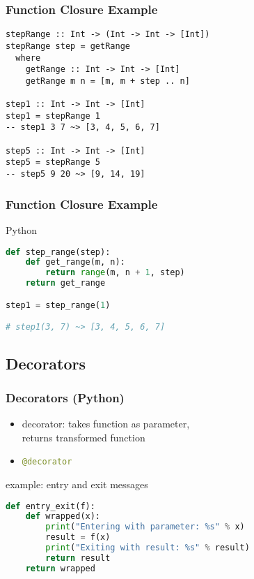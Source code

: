 \documentclass[dvipsnames]{beamer}
\theoremstyle{plain}
\begin{document}
\begin{frame}[fragile]
  \frametitle{Function Closure Example}

  \begin{lstlisting}
stepRange :: Int -> (Int -> Int -> [Int])
stepRange step = getRange
  where
    getRange :: Int -> Int -> [Int]
    getRange m n = [m, m + step .. n]

step1 :: Int -> Int -> [Int]
step1 = stepRange 1
-- step1 3 7 ~> [3, 4, 5, 6, 7]

step5 :: Int -> Int -> [Int]
step5 = stepRange 5
-- step5 9 20 ~> [9, 14, 19]
  \end{lstlisting}
\end{frame}

\begin{frame}[fragile]
  \frametitle{Function Closure Example}

  \begin{exampleblock}{Python}
    \begin{lstlisting}[language=Python]
def step_range(step):
    def get_range(m, n):
        return range(m, n + 1, step)
    return get_range

step1 = step_range(1)

# step1(3, 7) ~> [3, 4, 5, 6, 7]
    \end{lstlisting}
  \end{exampleblock}
\end{frame}

\subsection{Decorators}

\begin{frame}[fragile]
  \frametitle{Decorators (Python)}

  \begin{itemize}
    \item decorator: takes function as parameter,\\
      returns transformed function
    \item \lstinline[language=Python]|@decorator|
  \end{itemize}

  \begin{exampleblock}{example: entry and exit messages}
    \begin{lstlisting}[language=Python]
def entry_exit(f):
    def wrapped(x):
        print("Entering with parameter: %s" % x)
        result = f(x)
        print("Exiting with result: %s" % result)
        return result
    return wrapped
    \end{lstlisting}
  \end{exampleblock}
\end{frame}
\end{document}
